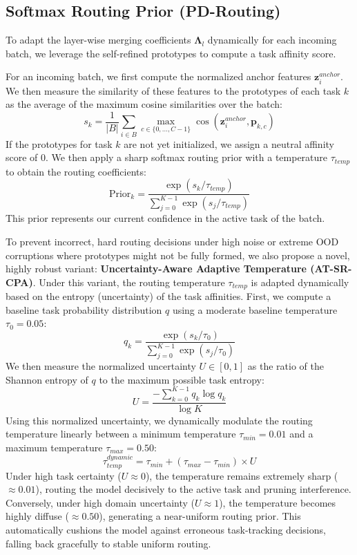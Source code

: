 \documentclass{article}
\theoremstyle{plain}
\theoremstyle{definition}
\theoremstyle{remark}
\begin{document}
\subsection{Softmax Routing Prior (PD-Routing)}
\label{subsec:routing}

To adapt the layer-wise merging coefficients $\boldsymbol{\Lambda}_l$ dynamically for each incoming batch, we leverage the self-refined prototypes to compute a task affinity score. 

For an incoming batch, we first compute the normalized anchor features $\boldsymbol{z}_i^{anchor}$. We then measure the similarity of these features to the prototypes of each task $k$ as the average of the maximum cosine similarities over the batch:
\begin{equation}
    s_k = \frac{1}{|B|} \sum_{i \in B} \max_{c \in \{0,\dots,C-1\}} \cos\left(\boldsymbol{z}_i^{anchor}, \boldsymbol{p}_{k,c}\right)
\end{equation}
If the prototypes for task $k$ are not yet initialized, we assign a neutral affinity score of $0$. We then apply a sharp softmax routing prior with a temperature $\tau_{temp}$ to obtain the routing coefficients:
\begin{equation}
    \text{Prior}_k = \frac{\exp(s_k / \tau_{temp})}{\sum_{j=0}^{K-1} \exp(s_j / \tau_{temp})}
\end{equation}
This prior represents our current confidence in the active task of the batch.

To prevent incorrect, hard routing decisions under high noise or extreme OOD corruptions where prototypes might not be fully formed, we also propose a novel, highly robust variant: \textbf{Uncertainty-Aware Adaptive Temperature (AT-SR-CPA)}. Under this variant, the routing temperature $\tau_{temp}$ is adapted dynamically based on the entropy (uncertainty) of the task affinities. First, we compute a baseline task probability distribution $q$ using a moderate baseline temperature $\tau_0 = 0.05$:
\begin{equation}
    q_k = \frac{\exp(s_k / \tau_0)}{\sum_{j=0}^{K-1} \exp(s_j / \tau_0)}
\end{equation}
We then measure the normalized uncertainty $U \in [0, 1]$ as the ratio of the Shannon entropy of $q$ to the maximum possible task entropy:
\begin{equation}
    U = \frac{-\sum_{k=0}^{K-1} q_k \log q_k}{\log K}
\end{equation}
Using this normalized uncertainty, we dynamically modulate the routing temperature linearly between a minimum temperature $\tau_{min} = 0.01$ and a maximum temperature $\tau_{max} = 0.50$:
\begin{equation}
    \tau_{temp}^{dynamic} = \tau_{min} + (\tau_{max} - \tau_{min}) \times U
\end{equation}
Under high task certainty ($U \approx 0$), the temperature remains extremely sharp ($\approx 0.01$), routing the model decisively to the active task and pruning interference. Conversely, under high domain uncertainty ($U \approx 1$), the temperature becomes highly diffuse ($\approx 0.50$), generating a near-uniform routing prior. This automatically cushions the model against erroneous task-tracking decisions, falling back gracefully to stable uniform routing.
\end{document}
